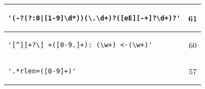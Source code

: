 \begin{table}
\begin{center}
\begin{tabular}{lc}
\begin{minipage}{2.4in}
\begin{verbatim}
'(-?(?:0|[1-9]\d*))(\.\d+)?([eE][-+]?\d+)?'\end{verbatim}
\end{minipage}
& 61 \\
\midrule
\begin{minipage}{2.4in}
\begin{verbatim}
'[^]]+?\] +([0-9.]+): (\w+) <-(\w+)'\end{verbatim}
\end{minipage}
& 60 \\
\midrule
\begin{minipage}{2.4in}
\begin{verbatim}
'.*rlen=([0-9]+)'\end{verbatim}
\end{minipage}
& 57 \\
\bottomrule
\end{tabular}
\end{center}
\end{table}

